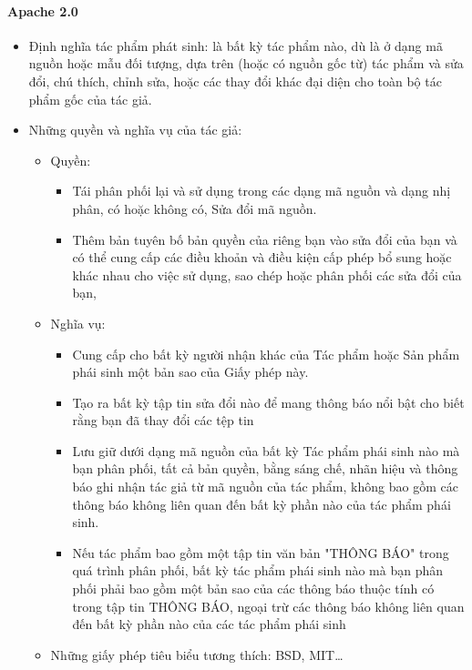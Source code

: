 \documentclass[12pt]{article}
\begin{document}
\paragraph{Apache 2.0}
\begin{itemize}
\item Định nghĩa tác phẩm phát sinh: là bất kỳ tác phẩm nào, dù là ở dạng mã nguồn hoặc mẫu đối tượng, dựa trên (hoặc có nguồn gốc từ) tác phẩm và  sửa đổi, chú thích, chỉnh sửa, hoặc các thay đổi khác đại diện cho toàn bộ tác phẩm gốc của tác giả. 
\item Những quyền và nghĩa vụ của tác giả: 

\begin{itemize}
\item Quyền:
\begin{itemize}
\item Tái phân phối lại và sử dụng trong các dạng mã nguồn và dạng nhị phân, có hoặc không có, Sửa đổi mã nguồn. 
\item  Thêm bản tuyên bố bản quyền của riêng bạn vào sửa đổi của bạn và có thể cung cấp các điều khoản và điều kiện cấp phép bổ sung hoặc khác nhau cho việc sử dụng, sao chép hoặc phân phối các sửa đổi của bạn,
\end{itemize}
\item Nghĩa vụ:

\begin{itemize}
\item Cung cấp cho bất kỳ người nhận khác của Tác phẩm hoặc Sản phẩm phái sinh một bản sao của Giấy phép này. 
\item Tạo ra bất kỳ tập tin sửa đổi nào để mang thông báo nổi bật cho biết rằng bạn đã thay đổi các tệp tin 
\item Lưu giữ dưới dạng mã nguồn của bất kỳ Tác phẩm phái sinh nào mà bạn phân phối, tất cả bản quyền, bằng sáng chế, nhãn hiệu và thông báo ghi nhận tác giả từ mã nguồn của tác phẩm, không bao gồm các thông báo không liên quan đến bất kỳ phần nào của tác phẩm phái sinh. 
\item Nếu tác phẩm bao gồm một tập tin văn bản "THÔNG BÁO" trong quá trình phân phối, bất kỳ tác phẩm phái sinh nào mà bạn phân phối phải bao gồm một bản sao của các thông báo thuộc tính có trong tập tin THÔNG BÁO, ngoại trừ các thông báo không liên quan đến bất kỳ phần nào của các tác phẩm phái sinh
\end{itemize}
\item Những giấy phép tiêu biểu tương thích: BSD, MIT… 
\end{itemize}
\end{itemize}
\end{document}
